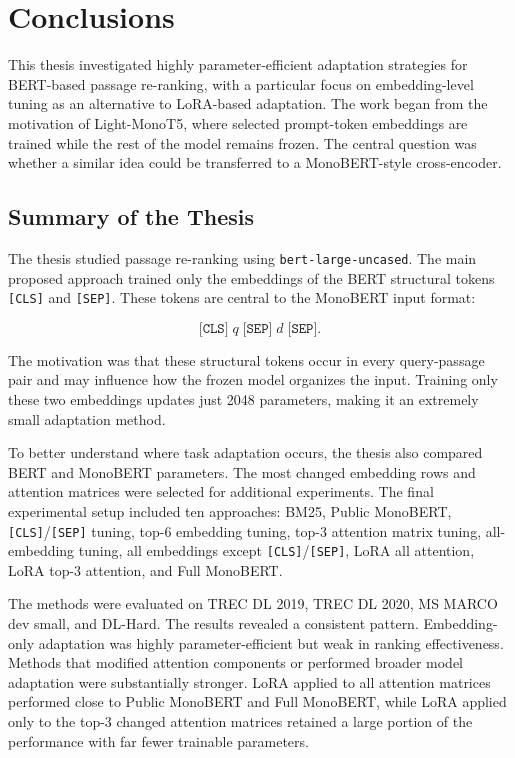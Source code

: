 \chapter{Conclusions}
\label{ch:conclusions}

This thesis investigated highly parameter-efficient adaptation strategies for BERT-based passage re-ranking, with a particular focus on embedding-level tuning as an alternative to LoRA-based adaptation. The work began from the motivation of Light-MonoT5, where selected prompt-token embeddings are trained while the rest of the model remains frozen. The central question was whether a similar idea could be transferred to a MonoBERT-style cross-encoder.

\section{Summary of the Thesis}
\label{sec:conclusions_summary}

The thesis studied passage re-ranking using \texttt{bert-large-uncased}. The main proposed approach trained only the embeddings of the BERT structural tokens \texttt{[CLS]} and \texttt{[SEP]}. These tokens are central to the MonoBERT input format:

\begin{equation}
    \texttt{[CLS]} \; q \; \texttt{[SEP]} \; d \; \texttt{[SEP]}.
\end{equation}

The motivation was that these structural tokens occur in every query-passage pair and may influence how the frozen model organizes the input. Training only these two embeddings updates just 2048 parameters, making it an extremely small adaptation method.

To better understand where task adaptation occurs, the thesis also compared BERT and MonoBERT parameters. The most changed embedding rows and attention matrices were selected for additional experiments. The final experimental setup included ten approaches: BM25, Public MonoBERT, \texttt{[CLS]}/\texttt{[SEP]} tuning, top-6 embedding tuning, top-3 attention matrix tuning, all-embedding tuning, all embeddings except \texttt{[CLS]}/\texttt{[SEP]}, LoRA all attention, LoRA top-3 attention, and Full MonoBERT.

The methods were evaluated on TREC DL 2019, TREC DL 2020, MS MARCO dev small, and DL-Hard. The results revealed a consistent pattern. Embedding-only adaptation was highly parameter-efficient but weak in ranking effectiveness. Methods that modified attention components or performed broader model adaptation were substantially stronger. LoRA applied to all attention matrices performed close to Public MonoBERT and Full MonoBERT, while LoRA applied only to the top-3 changed attention matrices retained a large portion of the performance with far fewer trainable parameters.

